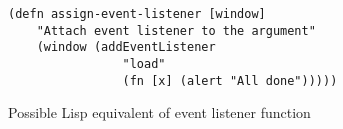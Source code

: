 \begin{figure}[ht]
\begin{verbatim}
(defn assign-event-listener [window]
	"Attach event listener to the argument"
	(window (addEventListener
            	"load"
                (fn [x] (alert "All done")))))
\end{verbatim}	
\caption{Possible Lisp equivalent of event listener function}
\label{fig:lispish-attach-event-listener}
\end{figure}